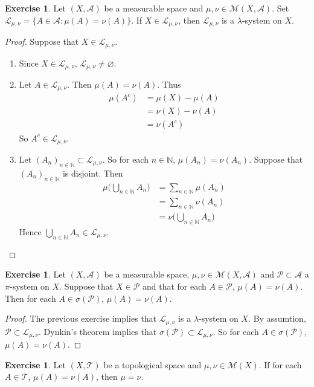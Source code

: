 \documentclass{book}
\theoremstyle{definition}
\newtheorem{ex}[definition]{Exercise}
\newcommand{\lam}{\lambda}
\newcommand{\sig}{\sigma}
\newcommand{\N}{\mathbb{N}}
\newcommand{\MA}{\mathcal{A}}
\newcommand{\ML}{\mathcal{L}}
\newcommand{\MM}{\mathcal{M}}
\newcommand{\MP}{\mathcal{P}}
\newcommand{\MT}{\mathcal{T}}
\DeclareMathOperator*{\0}{\mbf{0}}
\DeclareMathOperator*{\1}{\mbf{1}}
\begin{document}
	\begin{ex}
		Let $(X, \MA)$ be a measurable space and $\mu, \nu \in \MM(X, \MA)$. Set $\ML_{\mu,\nu} = \{A \in \MA: \mu(A) = \nu(A)\}$. If $X \in \ML_{\mu, \nu}$, then $\ML_{\mu, \nu}$ is a $\lam$-system on $X$.
	\end{ex}
	
	\begin{proof} Suppose that  $X \in \ML_{\mu, \nu}$.
		\begin{enumerate}
			\item Since $X \in \ML_{\mu, \nu}$, $\ML_{\mu, \nu} \neq \varnothing$.
			\item Let $A \in \ML_{\mu, \nu}$. Then $\mu(A) = \nu(A)$. Thus 
			\begin{align*}
				\mu(A^c) 
				&= \mu(X)-\mu(A) \\
				&= \nu(X) -\nu(A) \\
				&= \nu(A^c)
			\end{align*}
			So $A^c \in \ML_{\mu, \nu}$. 
			\item Let $(A_n)_{n \in \N} \subset \ML_{\mu, \nu}$. So for each $n \in \N$, $\mu(A_n) = \nu(A_n)$.  Suppose that $(A_n)_{n \in \N}$ is disjoint. Then 
			\begin{align*}
				\mu\bigg(\bigcup_{n \in \N} A_n\bigg) 
				&= \sum_{n \in \N} \mu(A_n) \\
				&= \sum_{n \in \N} \nu(A_n) \\
				&= \nu\bigg(\bigcup_{n \in \N} A_n\bigg) 
			\end{align*}
			Hence $\bigcup_{n \in \N} A_n \in \ML_{\mu, \nu}$.
		\end{enumerate}
	\end{proof}
	
	\begin{ex}
		Let $(X, \MA)$ be a measurable space, $\mu, \nu \in \MM(X, \MA)$ and $\MP \subset \MA$ a $\pi$-system on $X$. Suppose that $X \in \MP$ and that for each $A \in \MP$, $\mu(A) = \nu(A)$. Then for each $A \in \sig(\MP)$, $\mu(A) = \nu(A)$.
	\end{ex}
	
	\begin{proof}
		The previous exercise implies that $\ML_{\mu, \nu}$ is a $\lam$-system on $X$. By assumtion, $\MP \subset \ML_{\mu, \nu}$. Dynkin's theorem implies that $\sig(\MP) \subset \ML_{\mu, \nu}$. So for each $A \in \sig(\MP)$, $\mu(A) = \nu(A)$.
	\end{proof}

	\begin{ex}
		Let $(X, \MT)$ be a topological space and $\mu, \nu \in \MM(X)$. If for each $A \in \MT$, $\mu(A) = \nu(A)$, then $\mu = \nu$.
	\end{ex}
\end{document}
